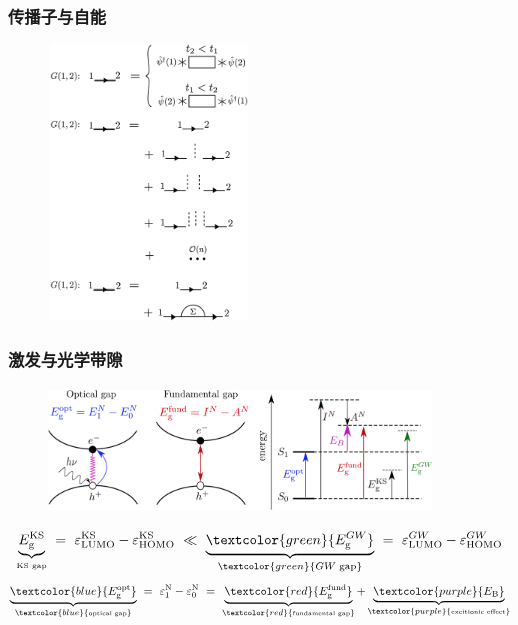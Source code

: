 {\frame
{
	\frametitle{传播子与自能}
\begin{figure}[h!]
	\vspace{-0.13in}
\centering
\includegraphics[height=2.88in,width=2.10in,viewport=0 0 510 715,clip]{Figures/DFT_GW-4.jpg}
\label{Green's_function-physical-interaction}
\end{figure}
}

\frame
{
	\frametitle{激发与光学带隙}
\begin{figure}[h!]
\centering
\vspace{-10pt}
\includegraphics[height=1.3in,width=4.00in,viewport=0 0 1470 470,clip]{Figures/Green_function-Gap.png}
\label{GW-Optical_Gap}
\end{figure}
\begin{displaymath}
		\underbrace{E_{\textrm{g}}^{\mathrm{KS}}}_{\textrm{\tiny KS~gap}}~=~\varepsilon_{\mathrm{LUMO}}^{\mathrm{KS}}-\varepsilon_{\mathrm{HOMO}}^{\mathrm{KS}}~\ll~\underbrace{\textcolor{green}{E_{\mathrm{g}}^{GW}}}_{\textcolor{green}{\tiny GW~\textrm{gap}}} ~=~\varepsilon_{\mathrm{LUMO}}^{GW}-\varepsilon_{\mathrm{HOMO}}^{GW}
\end{displaymath}
\begin{displaymath}
		\underbrace{\textcolor{blue}{E_{\textrm{g}}^{\mathrm{opt}}}}_{\textcolor{blue}{\textrm{\tiny optical~gap}}}~=~\varepsilon_1^{\mathrm{N}}-\varepsilon_0^{\mathrm{N}}~=~\underbrace{\textcolor{red}{E_{\mathrm{g}}^{\mathrm{fund}}}}_{\textcolor{red}{\textrm{\tiny fundamental~gap}}}+\underbrace{\textcolor{purple}{E_{\mathrm{B}}}}_{\textcolor{purple}{\textrm{\tiny excitionic effect}}}
\end{displaymath}
}

}
